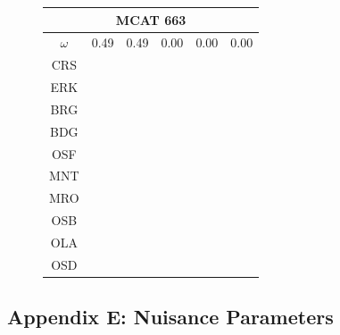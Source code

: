 \documentclass[12pt]{article}
\begin{document}
\begin{landscape}
\begin{figure}
\begin{minipage}[c]{0.3\textwidth}
\begin{tabular}{|c|c|c|c|c|c|}
         \hline \multicolumn{6}{|c|}{MCAT 663} \\ \hline
         $\omega$&0.49&0.49&0.00&0.00&0.00 \\ \hline
        CRS&\cellcolor[HTML]{E41A1C}&\cellcolor[HTML]{E41A1C}&\cellcolor[HTML]{E41A1C}&\cellcolor[HTML]{E41A1C}&\cellcolor[HTML]{E41A1C} \\ \hline
        ERK&\cellcolor[HTML]{E41A1C}&\cellcolor[HTML]{377EB8}&\cellcolor[HTML]{E41A1C}&\cellcolor[HTML]{E41A1C}&\cellcolor[HTML]{E41A1C} \\ \hline
        BRG&\cellcolor[HTML]{377EB8}&\cellcolor[HTML]{377EB8}&\cellcolor[HTML]{E41A1C}&\cellcolor[HTML]{377EB8}&\cellcolor[HTML]{377EB8} \\ \hline
        BDG&\cellcolor[HTML]{4DAF4A}&\cellcolor[HTML]{4DAF4A}&\cellcolor[HTML]{377EB8}&\cellcolor[HTML]{377EB8}&\cellcolor[HTML]{4DAF4A} \\ \hline
        OSF&\cellcolor[HTML]{984EA3}&\cellcolor[HTML]{984EA3}&\cellcolor[HTML]{377EB8}&\cellcolor[HTML]{377EB8}&\cellcolor[HTML]{984EA3} \\ \hline
        MNT&\cellcolor[HTML]{984EA3}&\cellcolor[HTML]{984EA3}&\cellcolor[HTML]{4DAF4A}&\cellcolor[HTML]{4DAF4A}&\cellcolor[HTML]{984EA3} \\ \hline
        MRO&\cellcolor[HTML]{FF7F00}&\cellcolor[HTML]{FF7F00}&\cellcolor[HTML]{4DAF4A}&\cellcolor[HTML]{4DAF4A}&\cellcolor[HTML]{984EA3} \\ \hline
        OSB&\cellcolor[HTML]{FFFF33}&\cellcolor[HTML]{FFFF33}&\cellcolor[HTML]{984EA3}&\cellcolor[HTML]{4DAF4A}&\cellcolor[HTML]{FF7F00} \\ \hline
        OLA&\cellcolor[HTML]{A65628}&\cellcolor[HTML]{A65628}&\cellcolor[HTML]{984EA3}&\cellcolor[HTML]{984EA3}&\cellcolor[HTML]{FF7F00} \\ \hline
        OSD&\cellcolor[HTML]{F781BF}&\cellcolor[HTML]{F781BF}&\cellcolor[HTML]{FF7F00}&\cellcolor[HTML]{FF7F00}&\cellcolor[HTML]{FFFF33} \\ \hline
\end{tabular}
\end{minipage}
\end{figure}
\end{landscape}

\subsection{Appendix E: Nuisance Parameters}\label{appE}
\end{document}
